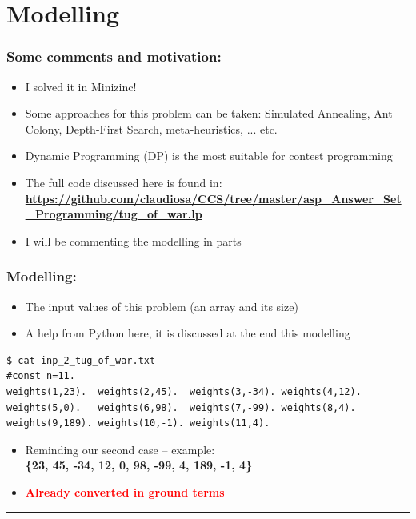 \documentclass{beamer}
\begin{document}
\section{Modelling}
\begin{frame}[fragile] 
	\frametitle{Some comments and motivation:}
	
\begin{block}{}
  \begin{itemize}

 \item I solved it in Minizinc!

  \item Some approaches for this problem can be taken: Simulated Annealing, Ant Colony, Depth-First Search,  meta-heuristics, ... etc.

\item Dynamic Programming (DP) is the most suitable for contest programming

  \item The full code discussed here is found in:\\ {\bf \textcolor{blue}{\url{https://github.com/claudiosa/CCS/tree/master/asp_Answer_Set_Programming/tug_of_war.lp}}}

  \item I will be commenting the modelling in parts 

   \end{itemize}
 \end{block}
	
	
\end{frame}
\begin{frame}[fragile] 
\frametitle{Modelling: }

\begin{itemize}
  \item The input values of this problem (an array and its size)
  \pause
  \item A help from Python here, it is discussed at the end this modelling

 \end{itemize}

	
{\small
\begin{verbatim}
$ cat inp_2_tug_of_war.txt
#const n=11.
weights(1,23).  weights(2,45).  weights(3,-34). weights(4,12). 
weights(5,0).   weights(6,98).  weights(7,-99). weights(8,4). 
weights(9,189). weights(10,-1). weights(11,4).
\end{verbatim}
}	

\begin{itemize}
\item Reminding our second case -- example:\\
{\bf \{23, 45, -34, 12, 0, 98, -99, 4, 189, -1, 4\}}

\item {\bf \textcolor{red}{Already converted in ground terms}}

\end{itemize}

\textcolor{red}{\rule{\textwidth}{1.7pt} } 

\end{frame}
\end{document}
